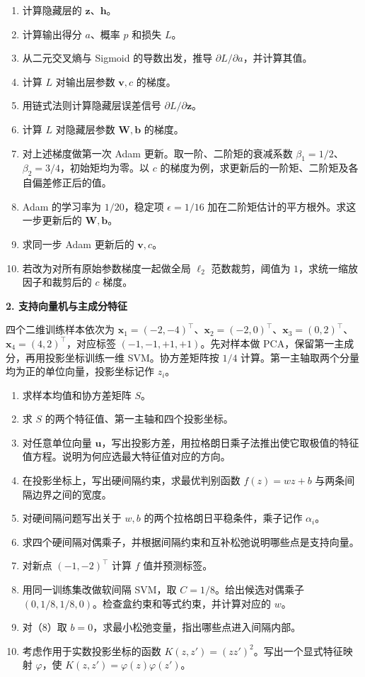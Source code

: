 \begin{enumerate}[label=(\arabic*)]
\item 计算隐藏层的 $\bm{z}$、$\bm{h}$。
\item 计算输出得分 $a$、概率 $p$ 和损失 $L$。
\item 从二元交叉熵与 Sigmoid 的导数出发，推导 $\partial L/\partial a$，并计算其值。
\item 计算 $L$ 对输出层参数 $\bm{v},c$ 的梯度。
\item 用链式法则计算隐藏层误差信号 $\partial L/\partial\bm{z}$。
\item 计算 $L$ 对隐藏层参数 $\bm{W},\bm{b}$ 的梯度。
\item 对上述梯度做第一次 Adam 更新。取一阶、二阶矩的衰减系数 $\beta_1=1/2$、$\beta_2=3/4$，初始矩均为零。以 $c$ 的梯度为例，求更新后的一阶矩、二阶矩及各自偏差修正后的值。
\item Adam 的学习率为 $1/20$，稳定项 $\epsilon=1/16$ 加在二阶矩估计的平方根外。求这一步更新后的 $\bm{W},\bm{b}$。
\item 求同一步 Adam 更新后的 $\bm{v},c$。
\item 若改为对所有原始参数梯度一起做全局 $\ell_2$ 范数裁剪，阈值为 $1$，求统一缩放因子和裁剪后的 $c$ 梯度。
\end{enumerate}

\noindent\textbf{2. 支持向量机与主成分特征}

四个二维训练样本依次为 $\bm x_1=(-2,-4)^\top$、$\bm x_2=(-2,0)^\top$、$\bm x_3=(0,2)^\top$、$\bm x_4=(4,2)^\top$，对应标签 $(-1,-1,+1,+1)$。先对样本做 PCA，保留第一主成分，再用投影坐标训练一维 SVM。协方差矩阵按 $1/4$ 计算。第一主轴取两个分量均为正的单位向量，投影坐标记作 $z_i$。

\begin{enumerate}[label=(\arabic*)]
\item 求样本均值和协方差矩阵 $S$。
\item 求 $S$ 的两个特征值、第一主轴和四个投影坐标。
\item 对任意单位向量 $\bm u$，写出投影方差，用拉格朗日乘子法推出使它取极值的特征值方程。说明为何应选最大特征值对应的方向。
\item 在投影坐标上，写出硬间隔约束，求最优判别函数 $f(z)=wz+b$ 与两条间隔边界之间的宽度。
\item 对硬间隔问题写出关于 $w,b$ 的两个拉格朗日平稳条件，乘子记作 $\alpha_i$。
\item 求四个硬间隔对偶乘子，并根据间隔约束和互补松弛说明哪些点是支持向量。
\item 对新点 $(-1,-2)^\top$ 计算 $f$ 值并预测标签。
\item 用同一训练集改做软间隔 SVM，取 $C=1/8$。给出候选对偶乘子 $(0,1/8,1/8,0)$。检查盒约束和等式约束，并计算对应的 $w$。
\item 对（8）取 $b=0$，求最小松弛变量，指出哪些点进入间隔内部。
\item 考虑作用于实数投影坐标的函数 $K(z,z')=(zz')^2$。写出一个显式特征映射 $\varphi$，使 $K(z,z')=\varphi(z)\varphi(z')$。
\end{enumerate}


